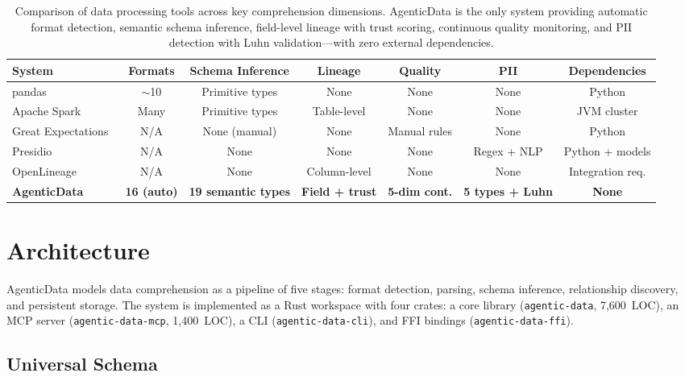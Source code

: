 \documentclass[10pt, twocolumn]{article}
\begin{document}
\begin{table}[t]
\caption{Comparison of data processing tools across key comprehension dimensions. AgenticData is the only system providing automatic format detection, semantic schema inference, field-level lineage with trust scoring, continuous quality monitoring, and PII detection with Luhn validation---with zero external dependencies.}
\label{tab:related}
\centering\scriptsize
\begin{tabular}{@{}lcccccc@{}}
\toprule
\textbf{System} & \textbf{Formats} & \textbf{Schema Inference} & \textbf{Lineage} & \textbf{Quality} & \textbf{PII} & \textbf{Dependencies} \\
\midrule
pandas~\cite{mckinney2010pandas} & $\sim$10 & Primitive types & None & None & None & Python \\
Apache Spark~\cite{apachespark2024} & Many & Primitive types & Table-level & None & None & JVM cluster \\
Great Expectations~\cite{greatexpectations2024} & N/A & None (manual) & None & Manual rules & None & Python \\
Presidio~\cite{presidio2024} & N/A & None & None & None & Regex + NLP & Python + models \\
OpenLineage~\cite{openlineage2024} & N/A & None & Column-level & None & None & Integration req. \\
\midrule
\textbf{AgenticData} & \textbf{16 (auto)} & \textbf{19 semantic types} & \textbf{Field + trust} & \textbf{5-dim cont.} & \textbf{5 types + Luhn} & \textbf{None} \\
\bottomrule
\end{tabular}
\end{table}


\section{Architecture}\label{sec:architecture}

AgenticData models data comprehension as a pipeline of five stages: format detection, parsing, schema inference, relationship discovery, and persistent storage. The system is implemented as a Rust workspace with four crates: a core library (\texttt{agentic-data}, 7{,}600~LOC), an MCP server (\texttt{agentic-data-mcp}, 1{,}400~LOC), a CLI (\texttt{agentic-data-cli}), and FFI bindings (\texttt{agentic-data-ffi}).

\subsection{Universal Schema}\label{sec:schema}
\end{document}
